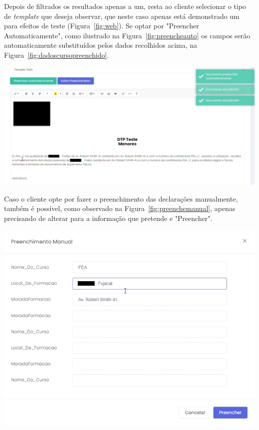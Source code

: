 Depois de filtrados os resultados apenas a um, resta ao cliente selecionar o tipo de \textit{template} que deseja observar, que neste caso apenas está demonstrado um para efeitos de teste (Figura~\ref{fig:web}). Se optar por "Preencher Automaticamente", como ilustrado na Figura~\ref{fig:preencheauto} os campos serão automaticamente substituídos pelos dados recolhidos acima, na Figura~\ref{fig:dadoscursopreenchido}.

\begin{center}
        \includegraphics[width=\textwidth,height=\textheight,keepaspectratio]{images/preencheauto.png}
        \label{fig:preencheauto}
\end{center}

Caso o cliente opte por fazer o preenchimento das declarações manualmente, também é possível, como observado na Figura~\ref{fig:preenchemanual}, apenas precisando de alterar para a informação que pretende e "Preencher".

\begin{center}
        \includegraphics[width=\textwidth,height=\textheight,keepaspectratio]{images/preenchemanual.png}
        \label{fig:preenchemanual}
\end{center}

